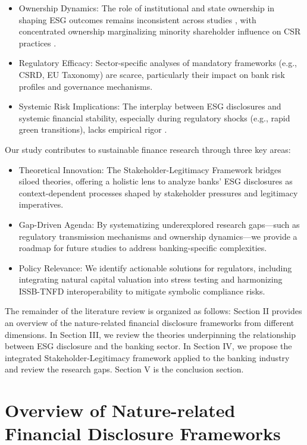 \documentclass[
  authoryear]{elsarticle}
\begin{document}
\begin{itemize}
\item
  Ownership Dynamics: The role of institutional and state ownership in
  shaping ESG outcomes remains inconsistent across studies
  \citep{DYCK2019, RAIMO2020}, with concentrated ownership marginalizing
  minority shareholder influence on CSR practices \citep{SMITH2022}.
\item
  Regulatory Efficacy: Sector-specific analyses of mandatory frameworks
  (e.g., CSRD, EU Taxonomy) are scarce, particularly their impact on
  bank risk profiles and governance mechanisms.
\item
  Systemic Risk Implications: The interplay between ESG disclosures and
  systemic financial stability, especially during regulatory shocks
  (e.g., rapid green transitions), lacks empirical rigor
  \citep{ESRB2016}.
\end{itemize}

Our study contributes to sustainable finance research through three key
areas:

\begin{itemize}
\item
  Theoretical Innovation: The Stakeholder-Legitimacy Framework bridges
  siloed theories, offering a holistic lens to analyze banks' ESG
  disclosures as context-dependent processes shaped by stakeholder
  pressures and legitimacy imperatives.
\item
  Gap-Driven Agenda: By systematizing underexplored research gaps---such
  as regulatory transmission mechanisms and ownership dynamics---we
  provide a roadmap for future studies to address banking-specific
  complexities.
\item
  Policy Relevance: We identify actionable solutions for regulators,
  including integrating natural capital valuation into stress testing
  and harmonizing ISSB-TNFD interoperability to mitigate symbolic
  compliance risks.
\end{itemize}

The remainder of the literature review is organized as follows: Section
II provides an overview of the nature-related financial disclosure
frameworks from different dimensions. In Section III, we review the
theories underpinning the relationship between ESG disclosure and the
banking sector. In Section IV, we propose the integrated
Stakeholder-Legitimacy framework applied to the banking industry and
review the research gaps. Section V is the conclusion section.

\section{Overview of Nature-related Financial Disclosure
Frameworks}\label{overview-of-nature-related-financial-disclosure-frameworks}
\end{document}
